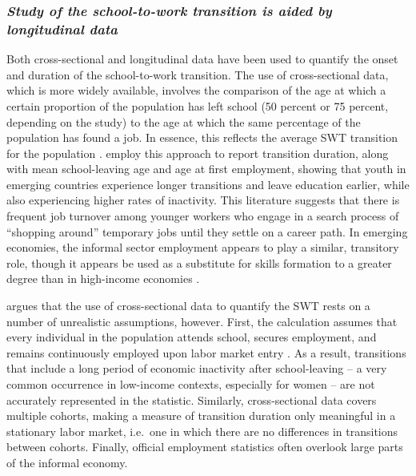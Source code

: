 \documentclass[
  a4paper, twoside, 12pt]{book}
\begin{document}
\hypertarget{study-of-the-school-to-work-transition-is-aided-by-longitudinal-data}{%
\subsubsection*{\texorpdfstring{\emph{Study of the school-to-work transition is aided by longitudinal data}}{Study of the school-to-work transition is aided by longitudinal data}}\label{study-of-the-school-to-work-transition-is-aided-by-longitudinal-data}}

Both cross-sectional and longitudinal data have been used to quantify the onset and duration of the school-to-work transition. The use of cross-sectional data, which is more widely available, involves the comparison of the age at which a certain proportion of the population has left school (50 percent or 75 percent, depending on the study) to the age at which the same percentage of the population has found a job. In essence, this reflects the average SWT transition for the population \autocite{nilsson2019}. \textcite{quintini2014} employ this approach to report transition duration, along with mean school-leaving age and age at first employment, showing that youth in emerging countries experience longer transitions and leave education earlier, while also experiencing higher rates of inactivity. This literature suggests that there is frequent job turnover among younger workers who engage in a search process of ``shopping around'' temporary jobs until they settle on a career path. In emerging economies, the informal sector employment appears to play a similar, transitory role, though it appears be used as a substitute for skills formation to a greater degree than in high-income economies \autocite{cunningham2008,bosch2010}.

\textcite{nilsson2019} argues that the use of cross-sectional data to quantify the SWT rests on a number of unrealistic assumptions, however. First, the calculation assumes that every individual in the population attends school, secures employment, and remains continuously employed upon labor market entry \autocite{ohiggins2008}. As a result, transitions that include a long period of economic inactivity after school-leaving -- a very common occurrence in low-income contexts, especially for women -- are not accurately represented in the statistic. Similarly, cross-sectional data covers multiple cohorts, making a measure of transition duration only meaningful in a stationary labor market, i.e.~one in which there are no differences in transitions between cohorts. Finally, official employment statistics often overlook large parts of the informal economy.
\end{document}
